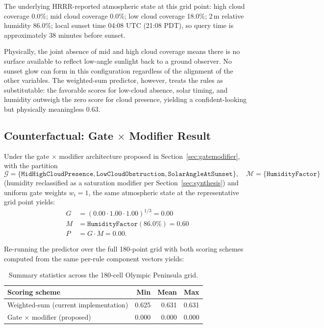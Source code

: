 \documentclass[11pt,a4paper]{article}
\begin{document}
The underlying HRRR-reported atmospheric state at this grid point: high cloud coverage 0.0\%; mid cloud coverage 0.0\%; low cloud coverage 18.0\%; 2\,m relative humidity 86.0\%; local sunset time 04:08 UTC (21:08 PDT), so query time is approximately 38 minutes before sunset.

Physically, the joint absence of mid and high cloud coverage means there is no surface available to reflect low-angle sunlight back to a ground observer. No sunset glow can form in this configuration regardless of the alignment of the other variables. The weighted-sum predictor, however, treats the rules as substitutable: the favorable scores for low-cloud absence, solar timing, and humidity outweigh the zero score for cloud presence, yielding a confident-looking but physically meaningless 0.63.

\subsection{Counterfactual: Gate $\times$ Modifier Result}

Under the gate $\times$ modifier architecture proposed in Section~\ref{sec:gatemodifier}, with the partition
\[
\mathcal{G} = \{\texttt{MidHighCloudPresence}, \texttt{LowCloudObstruction}, \texttt{SolarAngleAtSunset}\}, \quad \mathcal{M} = \{\texttt{HumidityFactor}\}
\]
(humidity reclassified as a saturation modifier per Section~\ref{sec:synthesis}) and uniform gate weights $w_i = 1$, the same atmospheric state at the representative grid point yields:
\begin{align*}
G &= (0.00 \cdot 1.00 \cdot 1.00)^{1/3} = 0.00 \\
M &= \texttt{HumidityFactor}(86.0\%) = 0.60 \\
P &= G \cdot M = 0.00.
\end{align*}

Re-running the predictor over the full 180-point grid with both scoring schemes computed from the same per-rule component vectors yields:

\begin{table}[H]
\centering
\small
\begin{tabular}{lrrr}
\toprule
Scoring scheme & Min & Mean & Max \\
\midrule
Weighted-sum (current implementation) & 0.625 & 0.631 & 0.631 \\
Gate $\times$ modifier (proposed) & 0.000 & 0.000 & 0.000 \\
\bottomrule
\end{tabular}
\caption{Summary statistics across the 180-cell Olympic Peninsula grid.}
\label{tab:casestudy_stats}
\end{table}
\end{document}
